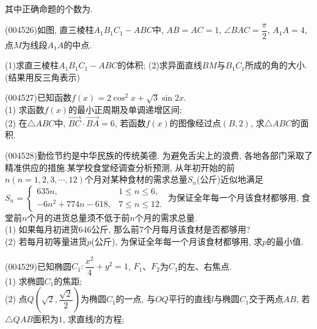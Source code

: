 其中正确命题的个数为.
\item (004526)如图, 直三棱柱$A_1B_1C_1-ABC$中, $AB=AC=1$, $\angle BAC=\dfrac{\pi}2$, $A_1A=4$, 点$M$为线段$A_1A$的中点.
\begin{center}
\end{center}
(1)求直三棱柱$A_1B_1C_1-ABC$的体积;
(2)求异面直线$BM$与$B_1C_1$所成的角的大小. (结果用反三角表示)
\item (004527)已知函数$f(x)=2\cos^2x+\sqrt 3\sin 2x$.\\
(1) 求函数$f(x)$的最小正周期及单调递增区间;\\
(2) 在$\triangle ABC$中, $\overrightarrow{BC}\cdot \overrightarrow{BA}=6$, 若函数$f(x)$的图像经过点$(B,2)$, 求$\triangle ABC$的面积.
\item (004528)勤俭节约是中华民族的传统美德. 为避免舌尖上的浪费, 各地各部门采取了精准供应的措施.某学校食堂经调查分析预测, 从年初开始的前$n(n=1,2,3,\cdots ,12)$个月对某种食材的需求总量$S_n$(公斤)近似地满足$S_n=\begin{cases} 635n, & 1\le n\le 6,  \\ -6n^2+774n-618, & 7\le n\le 12 . \end{cases}$ 为保证全年每一个月该食材都够用, 食堂前$n$个月的进货总量须不低于前$n$个月的需求总量.\\
(1) 如果每月初进货$646$公斤, 那么前$7$个月每月该食材是否都够用?\\
(2) 若每月初等量进货$p$(公斤), 为保证全年每一个月该食材都够用, 求$p$的最小值.
\item (004529)已知椭圆$C_1:\dfrac{x^2}4+{y^2}=1$, $F_1$、$F_2$为$C_1$的左、右焦点.\\
(1) 求椭圆$C_1$的焦距;\\
(2) 点$Q(\sqrt 2, \dfrac{\sqrt 2}2)$为椭圆$C_1$的一点, 与$OQ$平行的直线$l$与椭圆$C_1$交于两点$AB$, 若$\triangle QAB$面积为$1$, 求直线$l$的方程;\\
